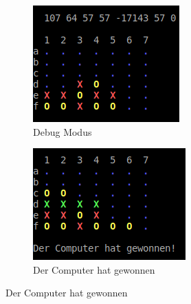 \documentclass[10pt,a4paper,titlepage]{article}
\begin{document}
\begin{figure}
	\centering
	\begin{subfigure}{.5\textwidth}
		\centering
		\includegraphics[width=0.9\linewidth]{img/debugmode.png}
		\caption{Debug Modus}
		\label{fig:sub3}
	\end{subfigure}%
	\begin{subfigure}{.5\textwidth}
		\centering
		\includegraphics[width=0.9\linewidth]{img/computerwon.png}
		\caption{Der Computer hat gewonnen}
		\label{fig:sub4}
	\end{subfigure}
	\label{fig:test}
\end{figure}
\end{document}
